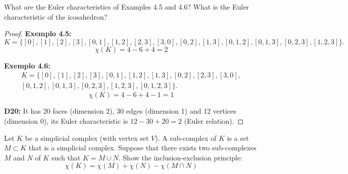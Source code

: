 \noindent\linia

\begin{exercise}
    What are the Euler characteristics of Examples 4.5 and 4.6? What is the Euler characteristic of the icosahedron?
\end{exercise}

\begin{proof}

\textbf{Exemplo 4.5:} 
$$K = \{[0], [1], [2], [3], [0, 1], [1, 2], [2, 3], [3, 0], [0, 2], [1, 3], [0, 1, 2], [0, 1, 3], [0, 2, 3], [1, 2, 3]\}.$$
$$
\chi (K) = 4 - 6 + 4 = 2
$$

\textbf{Exemplo 4.6:}
\begin{multline*}
    K = \{[0], [1],[2], [3], [0, 1], [1, 2], [1,3], [0,2] ,[2, 3], [3, 0], \\
    [0, 1, 2], [0, 1, 3], [0, 2, 3], [1, 2, 3], [0, 1, 2, 3]\}.    
\end{multline*}
$$
\chi (K) = 4 - 6 + 4 - 1 = 1
$$

\textbf{D20:} It has 20 faces (dimension 2), 30 edges (dimension 1) and 12
vertices (dimension 0), its Euler characteristic is $12 - 30 + 20 = 2$ (Euler
relation).

\end{proof}

\noindent\linia

\begin{exercise}
    Let $K$ be a simplicial complex (with vertex set $V$). A sub-complex of
    $K$ is a set $M \subset K$ that is a simplicial complex. Suppose that
    there exists two sub-complexes $M$ and $N$ of $K$ such that $K = M \cup
    N$. Show the inclusion-exclusion principle:
    $$
    \chi(K) = \chi(M) + \chi(N) - \chi(M \cap N)
    $$
\end{exercise}

